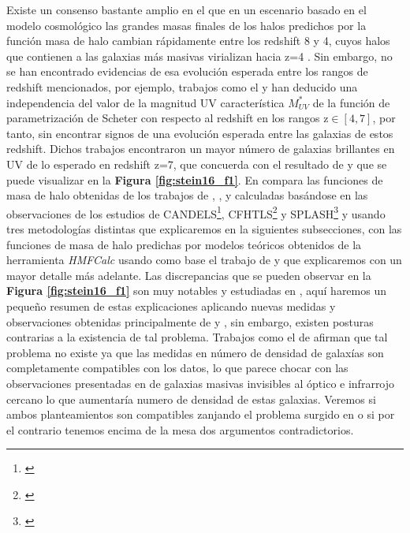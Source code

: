 Existe un consenso bastante amplio en el que en un escenario basado en el modelo cosmológico \lcdm las grandes masas finales de los halos predichos por la función masa de halo cambian rápidamente entre los redshift 8 y 4, cuyos halos que contienen a las galaxias más masivas virializan hacia z=4 \citep{steinhardt2016impossibly}. Sin embargo, no se han encontrado evidencias de esa evolución esperada entre los rangos de redshift mencionados, por ejemplo, trabajos como el \cite{finkelstein2015increasing} y \cite{finkelstein2015evolution} han deducido una independencia del valor de la magnitud UV característica $M^*_{UV}$ de la función de  parametrización de Scheter con respecto al redshift en los rangos z$\in [4,7]$, por tanto, sin encontrar signos de una evolución esperada entre las galaxias de estos redshift. Dichos trabajos encontraron un mayor número de galaxias brillantes en UV de lo esperado en redshift z=7, que concuerda con el resultado de \cite{steinhardt2016impossibly} y que se puede visualizar en la \textbf{Figura \ref{fig:stein16_f1}}. En \cite{steinhardt2016impossibly} compara las funciones de masa de halo obtenidas de los trabajos de \cite{hildebrandt2009cars}, \cite{steinhardt2014uniform}, \cite{bouwens2015reionization} y \cite{bouwens2015uv} calculadas basándose en las observaciones de los estudios de CANDELS\footnote{\cite{grogin2011candels}}, CFHTLS\footnote{\cite{hildebrandt2009cars}} y SPLASH\footnote{\cite{capak2012splash}} y usando tres metodologías distintas que explicaremos en la siguientes subsecciones, con las funciones de masa de halo predichas por modelos teóricos obtenidos de la herramienta \textit{HMFCalc} \citep{murray2013hmfcalc} usando como base el trabajo de \cite{sheth2001ellipsoidal} y que explicaremos con un mayor detalle más adelante. Las discrepancias que se pueden observar en la \textbf{Figura \ref{fig:stein16_f1}} son muy notables y estudiadas en \cite{steinhardt2016impossibly}, aquí haremos un pequeño resumen de estas explicaciones aplicando nuevas medidas y observaciones obtenidas principalmente de \cite{behroozi2019universemachine} y \cite{wang2019dominant}, sin embargo, existen posturas contrarias a la existencia de tal problema. Trabajos como el de \cite{behroozi2018mostmassive} afirman que tal problema no existe ya que las medidas en número de densidad de galaxías son completamente compatibles con los datos, lo que parece chocar con las observaciones presentadas en \cite{wang2019dominant} de galaxias masivas invisibles al óptico e infrarrojo cercano lo que aumentaría numero de densidad de estas galaxias. Veremos si ambos planteamientos son compatibles zanjando el problema surgido en \cite{steinhardt2016impossibly} o si por el contrario tenemos encima de la mesa dos argumentos contradictorios.\\

